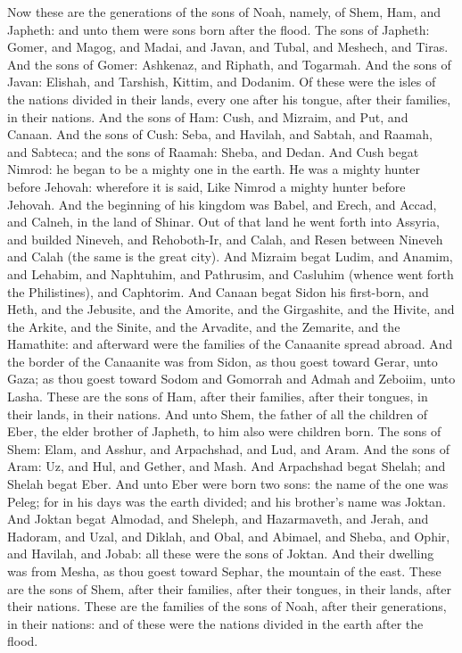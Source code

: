 Now these are the generations of the sons of Noah, namely, of Shem, Ham, and Japheth: and unto them were sons born after the flood.  The sons of Japheth: Gomer, and Magog, and Madai, and Javan, and Tubal, and Meshech, and Tiras. And the sons of Gomer: Ashkenaz, and Riphath, and Togarmah. And the sons of Javan: Elishah, and Tarshish, Kittim, and Dodanim. Of these were the isles of the nations divided in their lands, every one after his tongue, after their families, in their nations.  And the sons of Ham: Cush, and Mizraim, and Put, and Canaan. And the sons of Cush: Seba, and Havilah, and Sabtah, and Raamah, and Sabteca; and the sons of Raamah: Sheba, and Dedan. And Cush begat Nimrod: he began to be a mighty one in the earth. He was a mighty hunter before Jehovah: wherefore it is said, Like Nimrod a mighty hunter before Jehovah. And the beginning of his kingdom was Babel, and Erech, and Accad, and Calneh, in the land of Shinar. Out of that land he went forth into Assyria, and builded Nineveh, and Rehoboth-Ir, and Calah, and Resen between Nineveh and Calah (the same is the great city). And Mizraim begat Ludim, and Anamim, and Lehabim, and Naphtuhim, and Pathrusim, and Casluhim (whence went forth the Philistines), and Caphtorim.  And Canaan begat Sidon his first-born, and Heth, and the Jebusite, and the Amorite, and the Girgashite, and the Hivite, and the Arkite, and the Sinite, and the Arvadite, and the Zemarite, and the Hamathite: and afterward were the families of the Canaanite spread abroad. And the border of the Canaanite was from Sidon, as thou goest toward Gerar, unto Gaza; as thou goest toward Sodom and Gomorrah and Admah and Zeboiim, unto Lasha. These are the sons of Ham, after their families, after their tongues, in their lands, in their nations.  And unto Shem, the father of all the children of Eber, the elder brother of Japheth, to him also were children born. The sons of Shem: Elam, and Asshur, and Arpachshad, and Lud, and Aram. And the sons of Aram: Uz, and Hul, and Gether, and Mash. And Arpachshad begat Shelah; and Shelah begat Eber. And unto Eber were born two sons: the name of the one was Peleg; for in his days was the earth divided; and his brother’s name was Joktan. And Joktan begat Almodad, and Sheleph, and Hazarmaveth, and Jerah, and Hadoram, and Uzal, and Diklah, and Obal, and Abimael, and Sheba, and Ophir, and Havilah, and Jobab: all these were the sons of Joktan. And their dwelling was from Mesha, as thou goest toward Sephar, the mountain of the east. These are the sons of Shem, after their families, after their tongues, in their lands, after their nations.  These are the families of the sons of Noah, after their generations, in their nations: and of these were the nations divided in the earth after the flood. 

